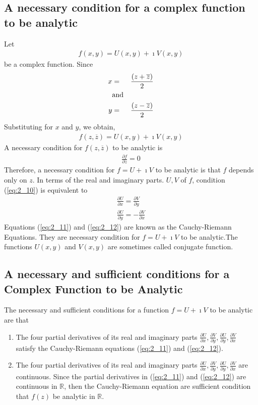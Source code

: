\documentclass[12pt]{report}
\newcommand{\sps}{\\[0.2cm]}
\newcommand{\refn}[1]{(\ref{#1})}
\newcommand{\refx}[1]{\refn{eq:#1}}
\newcommand{\zbar}{\overline{z}}
\newcommand{\dsp}{\displaystyle}
\newcommand{\real}{ \mathbb{R}}
\newcommand{\imaginary}{\imath}
\begin{document}
	\subsection{A necessary condition for a complex function to be analytic}
	Let 
	\begin{eqnarray}
		f(x,y) = U(x,y) + \imaginary V(x,y)
	\end{eqnarray}
	be a complex function. Since
	\begin{eqnarray}
		x&=&\frac{(z+\zbar)}{2}\\
		&\text{and}\notag\\
		y&=&\frac{(z-\zbar)}{2}
	\end{eqnarray}
	Substituting for $x$ and $y$, we obtain,
	\begin{eqnarray}
		f(z,\zbar) = U(x,y) + \imaginary V(x,y)
	\end{eqnarray}
	A necessary condition for $f(z,\zbar)$ to be analytic is
	\begin{eqnarray}
		\frac{\partial f}{\partial z} = 0\label{eq:2_10}
	\end{eqnarray}
	Therefore, a necessary condition for $f=U+\imaginary V$ to be analytic is that $f$ depends only on $z$. In terms of the real and imaginary parts. $U,V$ of $f$, condition \refx{2_10} is equivalent to 
	\begin{eqnarray}
		\frac{\partial U}{\partial x} = \frac{\partial V}{\partial y}\label{eq:2_11}\sps
		\frac{\partial U}{\partial y} = -\frac{\partial V}{\partial x}\label{eq:2_12}
	\end{eqnarray}
	Equations \refx{2_11} and \refx{2_12} are known as the Cauchy-Riemann Equations. They are necessary condition for $f=U+\imaginary V$ to be analytic.The functions $U(x,y)$ and $V(x,y)$ are sometimes called conjugate function.
	
	\subsection{A necessary and sufficient conditions for a Complex Function to be Analytic}
	The necessary and sufficient conditions for a function $f=U+\imaginary V$ to be analytic are that
	\begin{enumerate}
		\item The four partial derivatives of its real and imaginary parts $\dsp\frac{\partial U}{\partial x},\frac{\partial V}{\partial y}, \frac{\partial U}{\partial y}, \frac{\partial V}{\partial x}$ satisfy the Cauchy-Riemann equations \refx{2_11} and \refx{2_12}.
		\item The four partial derivatives of its real and imaginary parts $\dsp\frac{\partial U}{\partial x},\frac{\partial V}{\partial y}, \frac{\partial U}{\partial y}, \frac{\partial V}{\partial x}$ are continuous. Since the partial derivatives in \refx{2_11} and \refx{2_12} are continuous in $\real$, then the Cauchy-Riemann equation are sufficient condition that $f(z)$ be analytic in $\real$.
	\end{enumerate}
	
\end{document}
